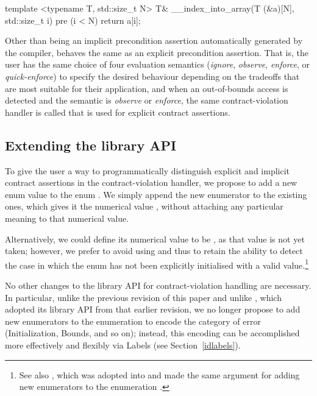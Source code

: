 \begin{codeblock}
template <typename T, std::size_t N>
T& __index_into_array(T (&a)[N], std::size_t i)
pre (i < N) {
  return a[i];
}
\end{codeblock}

Other than being an implicit precondition assertion automatically generated by the compiler,  behaves the same as an explicit precondition assertion. That is, the user has the same choice of four evaluation semantics (\emph{ignore}, \emph{observe}, \emph{enforce}, or \emph{quick-enforce}) to specify the desired behaviour depending on the tradeoffs that are most suitable for their application, and when an out-of-bounds access is detected and the semantic is \emph{observe} or \emph{enforce}, the same contract-violation handler is called that is used for explicit contract assertions.

\subsection{Extending the library API}
\label{library}

To give the user a way to programmatically distinguish explicit and implicit contract assertions in the contract-violation handler, we propose to add a new enum value  to the enum \mbox{}. We simply append the new enumerator to the existing ones, which gives it the numerical value , without attaching any particular meaning to that numerical value.

Alternatively, we could define its numerical value to be , as that value is not yet taken; however, we prefer to avoid using  and thus to retain the ability to detect the case in which the enum has not been explicitly initialised with a valid value.\footnote{See also \cite{P3227R0}, which was adopted into \cite{P2900R14} and made the same argument for adding new enumerators to the enumeration .}

No other changes to the library API for contract-violation handling are necessary. In particular, unlike the previous revision of this paper and unlike \cite{P3081R1}, which adopted its library API from that earlier revision, we no longer propose to add new enumerators to the enumeration \mbox{} to encode the category of error (Initialization, Bounds, and so on); instead, this encoding can be accomplished more effectively and flexibly via Labels (see Section~\ref{idlabels}).

